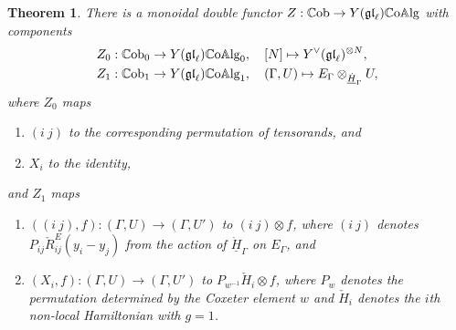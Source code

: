 \documentclass[11pt]{report}
\newtheorem{theorem}{Theorem}[section]
\theoremstyle{definition}
\theoremstyle{remark}
\theoremstyle{remark}
\begin{document}
\begin{theorem}
There is a monoidal double functor $Z: \mathbb{C}\textnormal{ob} \to Y(\mathfrak{gl}_\ell)\mathbb{C}\textnormal{o}\mathbb{A}\textnormal{lg}$ with components
\begin{align*}
Z_0&: \mathbb{C}\textnormal{ob}_0 \to Y(\mathfrak{gl}_\ell)\mathbb{C}\textnormal{o}\mathbb{A}\textnormal{lg}_0, \quad [N] \mapsto Y^\vee(\mathfrak{gl}_\ell)^{\otimes N}, \\
Z_1&: \mathbb{C}\textnormal{ob}_1 \to Y(\mathfrak{gl}_\ell)\mathbb{C}\textnormal{o}\mathbb{A}\textnormal{lg}_1, \quad (\Gamma,U) \mapsto E_\Gamma \otimes_{\underline{\dot H}_\Gamma} U,
\end{align*}
where $Z_0$ maps
\begin{enumerate}[label=(\roman*)]
\item $(i \ j)$ to the corresponding permutation of tensorands, and
\item $X_i$ to the identity,
\end{enumerate}
and $Z_1$ maps
\begin{enumerate}[label=(\roman*)]
\item $((i \ j),f): (\Gamma,U) \to (\Gamma,U')$ to $(i \ j) \otimes f$, where $(i \ j)$ denotes $P_{ij} \check R_{ij}^E(y_i-y_j)$ from the action of $\underline{\dot H}_\Gamma$ on $E_\Gamma$, and
\item $(X_i,f): (\Gamma,U) \to (\Gamma,U')$ to $P_{w^{-1}} \check H_i \otimes f$, where $P_w$ denotes the permutation determined by the Coxeter element $w$ and $\check H_i$ denotes the $i$th non-local Hamiltonian with $g=1$.
\end{enumerate}
\end{theorem}
\end{document}
